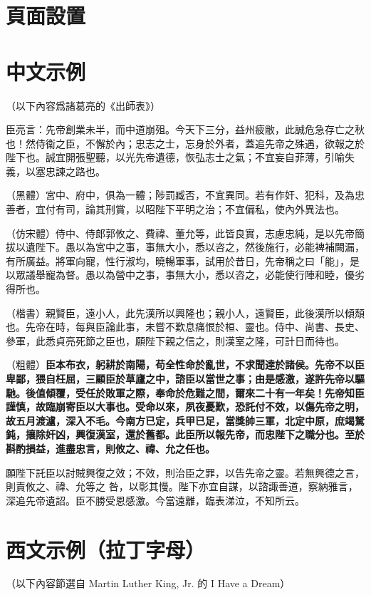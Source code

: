 \documentclass[
oneside,
12pt,
]{book}
\begin{document}
\section{頁面設置}

\section{中文示例}

（以下內容爲諸葛亮的《出師表》）

臣亮言：先帝創業未半，而中道崩殂。今天下三分，益州疲敝，此誠危急存亡之秋也！然侍衞之臣，不懈於內；忠志之士，忘身於外者，蓋追先帝之殊遇，欲報之於陛下也。誠宜開張聖聽，以光先帝遺德，恢弘志士之氣；不宜妄自菲薄，引喻失義，以塞忠諫之路也。

（黑體）{\heiti 宮中、府中，俱為一體；陟罰臧否，不宜異同。若有作奸、犯科，及為忠善者，宜付有司，論其刑賞，以昭陛下平明之治；不宜偏私，使內外異法也。}

（仿宋體）{\fangsong 侍中、侍郎郭攸之、費禕、董允等，此皆良實，志慮忠純，是以先帝簡拔以遺陛下。愚以為宮中之事，事無大小，悉以咨之，然後施行，必能裨補闕漏，有所廣益。將軍向寵，性行淑均，曉暢軍事，試用於昔日，先帝稱之曰「能」，是以眾議舉寵為督。愚以為營中之事，事無大小，悉以咨之，必能使行陣和睦，優劣得所也。}

（楷書）{\kaishu 親賢臣，遠小人，此先漢所以興隆也；親小人，遠賢臣，此後漢所以傾頹也。先帝在時，每與臣論此事，未嘗不歎息痛恨於桓、靈也。侍中、尚書、長史、參軍，此悉貞亮死節之臣也，願陛下親之信之，則漢室之隆，可計日而待也。}

（粗體）\textbf{臣本布衣，躬耕於南陽，苟全性命於亂世，不求聞達於諸侯。先帝不以臣卑鄙，猥自枉屈，三顧臣於草廬之中，諮臣以當世之事；由是感激，遂許先帝以驅馳。後值傾覆，受任於敗軍之際，奉命於危難之間，爾來二十有一年矣！先帝知臣謹慎，故臨崩寄臣以大事也。受命以來，夙夜憂歎，恐託付不效，以傷先帝之明，故五月渡瀘，深入不毛。今南方已定，兵甲已足，當獎帥三軍，北定中原，庶竭駑鈍，攘除奸凶，興復漢室，還於舊都。此臣所以報先帝，而忠陛下之職分也。至於斟酌損益，進盡忠言，則攸之、禕、允之任也。}

願陛下託臣以討賊興復之效；不效，則治臣之罪，以告先帝之靈。若無興德之言，則責攸之、禕、允等之 咎，以彰其慢。陛下亦宜自謀，以諮諏善道，察納雅言，深追先帝遺詔。臣不勝受恩感激。今當遠離，臨表涕泣，不知所云。

\section{西文示例（拉丁字母）}

（以下內容節選自 Martin Luther King, Jr. 的 I Have a Dream）
\end{document}
